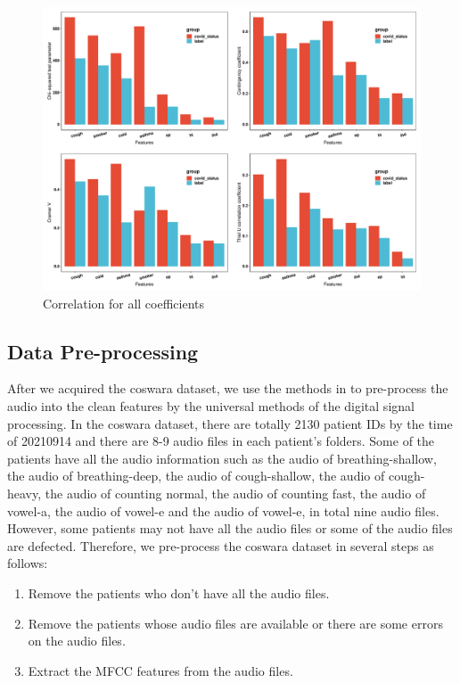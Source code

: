 \documentclass[11pt]{article}
\begin{document}
\begin{figure}[htbp]{}
	\centering
    \includegraphics[width=1.0\textwidth]{./imgs/cor_total.pdf} %
    \caption{Correlation for all coefficients}
    \label{fig:cor_total}
\end{figure}

\subsection{Data Pre-processing}

After we acquired the coswara dataset, we use the methods in \cite{xue2021exploring} to pre-process the audio into the clean features by the universal methods of the digital signal processing. In the coswara dataset, there are totally 2130 patient IDs by the time of 20210914 and there are 8-9 audio files in each patient's folders. Some of the patients have all the audio information such as the audio of breathing-shallow, the audio of breathing-deep, the audio of cough-shallow, the audio of cough-heavy, the audio of counting normal, the audio of counting fast, the audio of vowel-a, the audio of vowel-e and the audio of vowel-e, in total nine audio files. However, some patients may not have all the audio files or some of the audio files are defected. Therefore, we pre-process the coswara dataset in several steps as follows:

\begin{enumerate}
	\item Remove the patients who don’t have all the audio files.
	\item Remove the patients whose audio files are available or there are some errors on the audio files.
	\item Extract the MFCC features from the audio files.
\end{enumerate}
\end{document}
